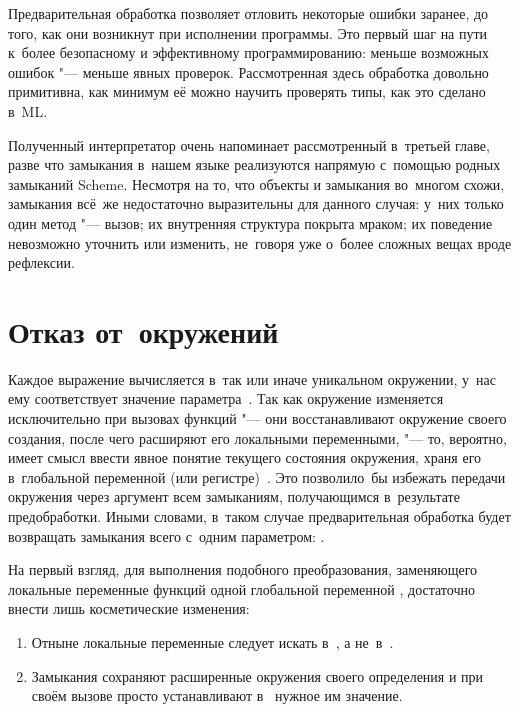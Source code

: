 Предварительная обработка позволяет отловить некоторые ошибки заранее, до того,
как они возникнут при исполнении программы. Это первый шаг на пути к~более
безопасному и эффективному программированию: меньше возможных ошибок "--- меньше
явных проверок. Рассмотренная здесь обработка довольно примитивна, как минимум
её можно научить проверять типы, как это сделано в~ML.

Полученный интерпретатор очень напоминает рассмотренный в~третьей главе, разве
что замыкания в~нашем языке реализуются напрямую с~помощью родных замыканий
Scheme. Несмотря на то, что объекты и замыкания во~многом схожи, замыкания
всё~же недостаточно выразительны для данного случая: у~них только один метод
"--- вызов; их внутренняя структура покрыта мраком; их поведение невозможно
уточнить или изменить, не~говоря уже о~более сложных вещах вроде рефлексии.


\section{Отказ от~окружений}\label{fast/sect:reject}

Каждое выражение вычисляется в~так или иначе уникальном окружении, у~нас ему
соответствует значение параметра~. Так как окружение изменяется
исключительно при вызовах функций "--- они восстанавливают окружение своего
создания, после чего расширяют его локальными переменными, "--- то, вероятно,
имеет смысл ввести явное понятие текущего состояния окружения, храня его
в~глобальной переменной (или регистре)~. Это позволило~бы избежать
передачи окружения через аргумент всем замыканиям, получающимся в~результате
предобработки. Иными словами, в~таком случае предварительная обработка будет
возвращать замыкания всего с~одним параметром: .

На первый взгляд, для выполнения подобного преобразования, заменяющего локальные
переменные функций  одной глобальной переменной , достаточно
внести лишь косметические изменения:

\begin{enumerate}
  \item Отныне локальные переменные следует искать в~,
        а не~в~.

  \item Замыкания сохраняют расширенные окружения своего определения
        и при своём вызове просто устанавливают в~ нужное им
        значение.
\end{enumerate}

